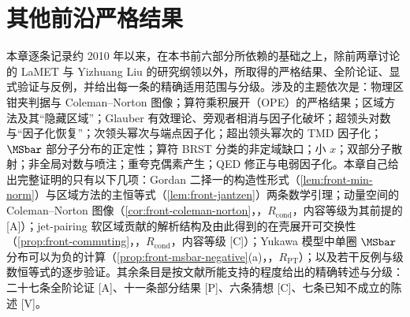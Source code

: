\chapter{其他前沿严格结果}\label{ch:front}

本章逐条记录约 2010 年以来，在本书前六部分所依赖的基础之上，除前两章讨论的 LaMET 与 Yizhuang Liu 的研究纲领以外，所取得的严格结果、全阶论证、显式验证与反例，并给出每一条的精确适用范围与分级。涉及的主题依次是：物理区钳夹判据与 Coleman--Norton 图像；算符乘积展开（OPE）的严格结果；区域方法及其“隐藏区域”；Glauber 有效理论、旁观者相消与因子化破坏；超领头对数与“因子化恢复”；次领头幂次与端点因子化；超出领头幂次的 TMD 因子化；$\MSbar$ 部分子分布的正定性；算符 BRST 分类的非定域缺口；小 $x$；双部分子散射；非全局对数与喷注；重夸克偶素产生；QED 修正与电弱因子化。本章自己给出完整证明的只有以下几项：Gordan 二择一的构造性形式（\cref{lem:front-min-norm}）与区域方法的主恒等式（\cref{lem:front-jantzen}）两条数学引理；动量空间的 Coleman--Norton 图像（\cref{cor:front-coleman-norton}，\tagR，$R_{\mathrm{cond}}$，内容等级为其前提的 [A]）；jet-pairing 软区域贡献的解析结构及由此得到的在壳展开可交换性（\cref{prop:front-commuting}，\tagR，$R_{\mathrm{cond}}$，内容等级 [C]）；Yukawa 模型中单圈 $\MSbar$ 分布可以为负的计算（\cref{prop:front-msbar-negative}(a)，\tagR，$R_{\mathrm{PT}}$）；以及若干反例与级数恒等式的逐步验证。其余条目是按文献所能支持的程度给出的精确转述与分级：二十七条全阶论证 [A]、十一条部分结果 [P]、六条猜想 [C]、七条已知不成立的陈述 [V]。

